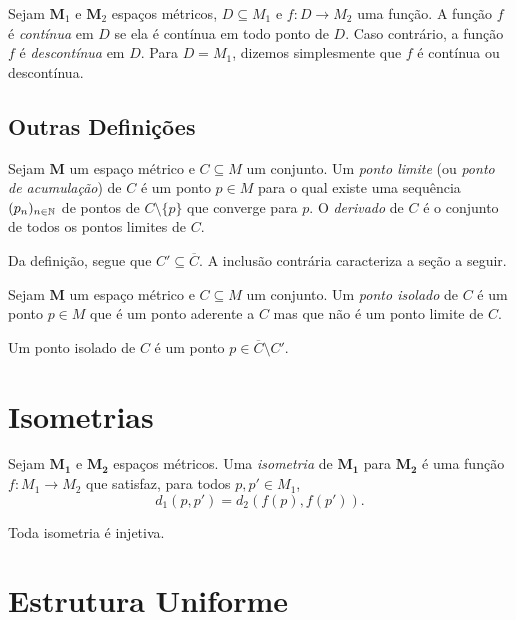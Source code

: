 \begin{defi}
Sejam $\bm M_1$ e $\bm M_2$ espaços métricos, $D \subseteq M_1$ e $f: D \to M_2$ uma função. A função $f$ é \emph{contínua} em $D$ se ela é contínua em todo ponto de $D$. Caso contrário, a função $f$ é \emph{descontínua} em $D$. Para $D=M_1$, dizemos simplesmente que $f$ é contínua ou descontínua.
\end{defi}

\subsection{Outras Definições}

\begin{defi}
Sejam $\bm M$ um espaço métrico e $C \subseteq M$ um conjunto. Um \emph{ponto limite} (ou \emph{ponto de acumulação}) de $C$ é um ponto $p \in M$ para o qual existe uma sequência $(p_n)_{n \in \mathbb{N}}$ de pontos de $C \setminus \{p\}$ que converge para $p$. O \emph{derivado} de $C$ é o conjunto de todos os pontos limites de $C$. 
\end{defi}

Da definição, segue que $C' \subseteq \overline C$. A inclusão contrária caracteriza a seção a seguir.

\begin{defi}
Sejam $\bm M$ um espaço métrico e $C \subseteq M$ um conjunto. Um \emph{ponto isolado} de $C$ é um ponto $p \in M$ que é um ponto aderente a $C$ mas que não é um ponto limite de $C$.
\end{defi}

Um ponto isolado de $C$ é um ponto $p \in \overline C \setminus C'$.

\section{Isometrias}

\begin{defi}
Sejam $\bm{M_1}$ e $\bm{M_2}$ espaços métricos. Uma \emph{isometria} de $\bm{M_1}$ para $\bm{M_2}$ é uma função $f: M_1 \to M_2$ que satisfaz, para todos $p,p' \in M_1$,
	\begin{equation*}
	d_1(p,p') = d_2(f(p),f(p')).
	\end{equation*}
\end{defi}

\begin{prop}
Toda isometria é injetiva.
\end{prop}

\section{Estrutura Uniforme}

